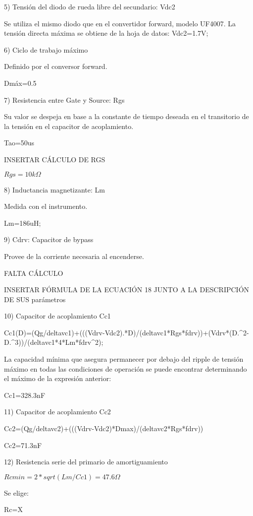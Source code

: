 5) Tensión del diodo de rueda libre del secundario: Vdc2

Se utiliza el mismo diodo que en el convertidor forward, modelo UF4007. 
La tensión directa máxima se obtiene de la hoja de datos: 
Vdc2=1.7V;

6) Ciclo de trabajo máximo 

Definido por el conversor forward.

Dmáx=0.5

7) Resistencia entre Gate y Source: Rgs

Su valor se despeja en base a la constante de tiempo deseada en el transitorio de la tensión en el capacitor de acoplamiento.

Tao=50us

INSERTAR CÁLCULO DE RGS

$Rgs=10k\Omega$

8) Inductancia magnetizante: Lm

Medida con el instrumento. 

Lm=186uH;

9) Cdrv: Capacitor de bypass

Provee de la corriente necesaria al encenderse. 

FALTA CÁLCULO

INSERTAR FÓRMULA DE LA ECUACIÓN 18 JUNTO A LA DESCRIPCIÓN DE SUS parámetros

10) Capacitor de acoplamiento Cc1

Cc1(D)=(Qg/deltavc1)+(((Vdrv-Vdc2).*D)/(deltavc1*Rgs*fdrv))+(Vdrv*(D.^2-D.^3))/(deltavc1*4*Lm*fdrv^2);

La capacidad mínima que asegura permanecer por debajo del ripple de tensión máximo en todas las condiciones de operación 
se puede encontrar determinando el máximo de la expresión anterior:

Cc1=328.3nF

11) Capacitor de acoplamiento Cc2

Cc2=(Qg/deltavc2)+(((Vdrv-Vdc2)*Dmax)/(deltavc2*Rgs*fdrv))

Cc2=71.3nF

12) Resistencia serie del primario de amortiguamiento

$Rcmin=2*sqrt(Lm/Cc1)=47.6\Omega$

Se elige:

Rc=X